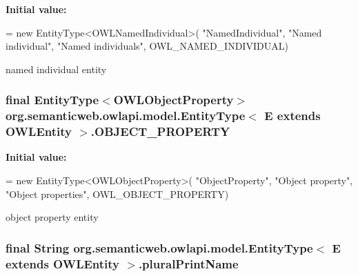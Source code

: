 {\bfseries Initial value\-:}
\begin{DoxyCode}
= \textcolor{keyword}{new} EntityType<OWLNamedIndividual>(
            \textcolor{stringliteral}{"NamedIndividual"}, \textcolor{stringliteral}{"Named individual"}, \textcolor{stringliteral}{"Named individuals"},
            OWL\_NAMED\_INDIVIDUAL)
\end{DoxyCode}
named individual entity \hypertarget{classorg_1_1semanticweb_1_1owlapi_1_1model_1_1_entity_type_3_01_e_01extends_01_o_w_l_entity_01_4_aafa518e99617ac074731d3894cc20080}{
\subsubsection[{O\-B\-J\-E\-C\-T\-\_\-\-P\-R\-O\-P\-E\-R\-T\-Y}]{\setlength{\rightskip}{0pt plus 5cm}final {\bf Entity\-Type}$<${\bf O\-W\-L\-Object\-Property}$>$ org.\-semanticweb.\-owlapi.\-model.\-Entity\-Type$<$ E extends {\bf O\-W\-L\-Entity} $>$.O\-B\-J\-E\-C\-T\-\_\-\-P\-R\-O\-P\-E\-R\-T\-Y\hspace{0.3cm}{\ttfamily [static]}}}\label{classorg_1_1semanticweb_1_1owlapi_1_1model_1_1_entity_type_3_01_e_01extends_01_o_w_l_entity_01_4_aafa518e99617ac074731d3894cc20080}
{\bfseries Initial value\-:}
\begin{DoxyCode}
= \textcolor{keyword}{new} EntityType<OWLObjectProperty>(
            \textcolor{stringliteral}{"ObjectProperty"}, \textcolor{stringliteral}{"Object property"}, \textcolor{stringliteral}{"Object properties"}, OWL\_OBJECT\_PROPERTY)
\end{DoxyCode}
object property entity \hypertarget{classorg_1_1semanticweb_1_1owlapi_1_1model_1_1_entity_type_3_01_e_01extends_01_o_w_l_entity_01_4_a0cb9d2799a8527ee95c59322aa6a5192}{
\subsubsection[{plural\-Print\-Name}]{\setlength{\rightskip}{0pt plus 5cm}final String org.\-semanticweb.\-owlapi.\-model.\-Entity\-Type$<$ E extends {\bf O\-W\-L\-Entity} $>$.plural\-Print\-Name\hspace{0.3cm}{\ttfamily [private]}}}\label{classorg_1_1semanticweb_1_1owlapi_1_1model_1_1_entity_type_3_01_e_01extends_01_o_w_l_entity_01_4_a0cb9d2799a8527ee95c59322aa6a5192}
